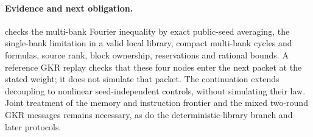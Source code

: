 \paragraph{Evidence and next obligation.}  checks the multi-bank Fourier inequality by exact public-seed averaging, the single-bank limitation in a valid local library, compact multi-bank cycles and formulas, source rank, block ownership, reservations and rational bounds. A reference GKR replay checks that these four nodes enter the next packet at the stated weight; it does not simulate that packet. The continuation  extends decoupling to nonlinear seed-independent controls, without simulating their law. Joint treatment of the memory and instruction frontier and the mixed two-round GKR messages remains necessary, as do the deterministic-library branch and later protocols.
